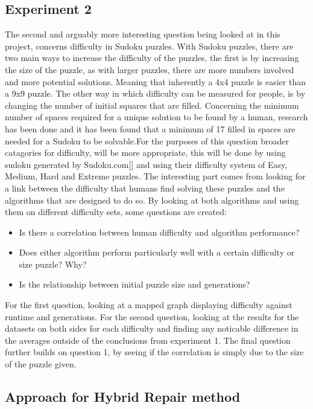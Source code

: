 \documentclass[a4paper,11pt]{article}
\begin{document}
\subsection{Experiment 2}
The second and arguably more interesting question being looked at in this project, concerns difficulty in Sudoku puzzles. With Sudoku puzzles, there are two main ways to increase the difficulty of the puzzles, the first is by increasing the size of the puzzle, as with larger puzzles, there are more numbers involved and more potential solutions. Meaning that inherently a 4x4 puzzle is easier than a 9x9 puzzle. The other way in which difficulty can be measured for people, is by changing the number of initial squares that are filled. Concerning the minimum number of spaces required for a unique solution to be found by a human, research has been done and it has been found that a minimum of 17 filled in spaces are needed for a Sudoku to be solvable.\newline \newline For the purposes of this question broader catagories for difficulty, will be more appropriate, this will be done by using sudoku generated by Sudoku.com[] and using their difficulty system of Easy, Medium, Hard and Extreme puzzles. The interesting part comes from looking for a link between the difficulty that humans find solving these puzzles and the algorithms that are designed to do so. By looking at both algorithms and using them on different difficulty sets, some questions are created:
\begin{itemize}
	\item Is there a correlation between human difficulty and algorithm performance?
	\item Does either algorithm perform particularly well with a certain difficulty or size puzzle? Why?
	\item Is the relationship between initial puzzle size and generations?
\end{itemize}
For the first question, looking at a mapped graph displaying difficulty against runtime and generations. For the second question, looking at the results for the datasets on both sides for each difficulty and finding any noticable difference in the averages outside of the conclusions from experiment 1. The final question further builds on question 1, by seeing if the correlation is simply due to the size of the puzzle given.

\subsection{Approach for Hybrid Repair method}
\end{document}
